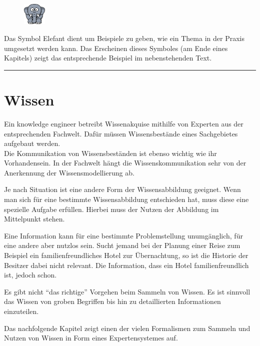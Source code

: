 \vspace{30pt}

\begin{figure}
    \vspace{-12pt}
    \includegraphics[width=0.1\textwidth]{bilder/elephant.png}
\end{figure}
Das Symbol Elefant dient um Beispiele zu geben, wie ein Thema in der Praxis umgesetzt werden kann. Das Erscheinen dieses Symboles (am Ende eines Kapitels) zeigt das entsprechende Beispiel im nebenstehenden Text.\\

\noindent\rule[1ex]{\textwidth}{1pt}

\newpage

\section{Wissen}
\label{chap:einleitung_wissen}
Ein knowledge engineer betreibt Wissenakquise mithilfe von Experten aus der entsprechenden Fachwelt. Dafür müssen Wissensbestände eines Sachgebietes aufgebaut werden. \\
Die Kommunikation von Wissensbeständen ist ebenso wichtig wie ihr Vorhandensein. In der Fachwelt hängt die Wissenskommunikation sehr von der Anerkennung der Wissensmodellierung ab.

Je nach Situation ist eine andere Form der Wissensabbildung geeignet. Wenn man sich für eine bestimmte Wissensabbildung entschieden hat, muss diese eine spezielle Aufgabe erfüllen. Hierbei muss der Nutzen der Abbildung im Mittelpunkt stehen.

Eine Information kann für eine bestimmte Problemstellung unumgänglich, für eine andere aber nutzlos sein. Sucht jemand bei der Planung einer Reise zum Beispiel ein familienfreundliches Hotel zur Übernachtung, so ist die Historie der Besitzer dabei nicht relevant. Die Information, dass ein Hotel familienfreundlich ist, jedoch schon.

Es gibt nicht ``das richtige'' Vorgehen beim Sammeln von Wissen. Es ist sinnvoll das Wissen von groben Begriffen bis hin zu detaillierten Informationen einzuteilen.

Das nachfolgende Kapitel zeigt einen der vielen Formalismen zum Sammeln und Nutzen von Wissen in Form eines Expertensystemes auf.
